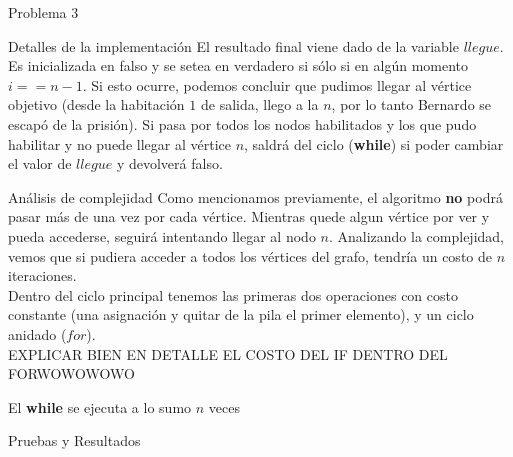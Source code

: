 \begin{section}{Problema 3}
\begin{subsection}{Detalles de la implementación}
		El resultado final viene dado de la variable $llegue$. Es inicializada en falso y se setea en verdadero si sólo si en algún momento $i == n-1$. Si esto ocurre, podemos concluir que pudimos llegar al vértice objetivo (desde la habitación $1$ de salida, llego a la $n$, por lo tanto Bernardo se escapó de la prisión). Si pasa por todos los nodos habilitados y los que pudo habilitar y no puede llegar al vértice $n$, saldrá del ciclo (\textbf{while}) si poder cambiar el valor de $llegue$ y devolverá falso.\\
		
	\end{subsection}


	\begin{subsection}{Análisis de complejidad}
		Como mencionamos previamente, el algoritmo \textbf{no} podrá pasar más de una vez por cada vértice. Mientras quede algun vértice por ver y pueda accederse, seguirá intentando llegar al nodo $n$. Analizando la complejidad, vemos que si pudiera acceder a todos los vértices del grafo, tendría un costo de $n$ iteraciones.\\
		Dentro del ciclo principal tenemos las primeras dos operaciones con costo constante (una asignación y quitar de la pila el primer elemento), y un ciclo anidado ($for$).\\
		EXPLICAR BIEN EN DETALLE EL COSTO DEL IF  DENTRO DEL FORWOWOWOWO
		
		
		El \textbf{while} se ejecuta a lo sumo $n$ veces
		
	\end{subsection}


	\begin{subsection}{Pruebas y Resultados}

	\end{subsection}

\end{section}

